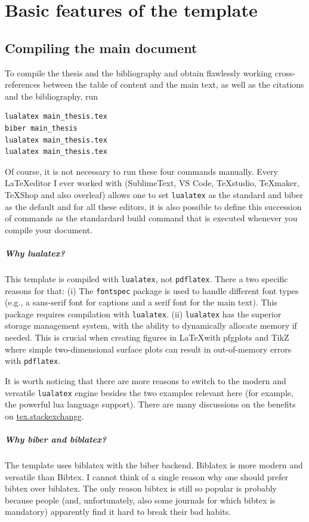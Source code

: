 \graphicspath{{chapters/1_basicfeatures/figures/}}

\chapter{Basic features of the template}
\section{Compiling the main document}
To compile the thesis and the bibliography and obtain flawlessly working cross-references between the table of content and the main text, as well as the citations and the bibliography, run
\begin{lstlisting}
lualatex main_thesis.tex
biber main_thesis
lualatex main_thesis.tex
lualatex main_thesis.tex
\end{lstlisting}
Of course, it is not necessary to run these four commands manually. Every \LaTeX editor I ever worked with (SublimeText, VS Code, TeXstudio, TeXmaker, TeXShop and also overleaf) allows one to set \verb|lualatex| as the standard and biber as the default and for all these editors, it is also possible to define this succession of commands as the standardard build command that is executed whenever you compile your document.

\paragraph{Why lualatex?} This template is compiled with \verb|lualatex|, not \verb|pdflatex|. There a two specific reasons for that: 
(i) The \verb|fontspec| package is used to handle different font types (e.g., a sans-serif font for captions and a serif font for the main text). This package requires compilation with \verb|lualatex|. 
(ii) \verb|lualatex| has the superior storage management system, with the ability to dynamically allocate memory if needed. This is crucial when creating figures in \LaTeX with pfgplots and TikZ where simple two-dimensional surface plots can result in out-of-memory errors with \verb|pdflatex|.

It is worth noticing that there are more reasons to switch to the modern and versatile \verb|lualatex| engine besides the two examples relevant here (for example, the powerful lua language support). There are many discussions on the benefits on \href{tex.stackexchange.com}{tex.stackexchange}.

\paragraph{Why biber and biblatex?} The template uses biblatex with the biber backend. Biblatex is more modern and versatile than Bibtex.
I cannot think of a single reason why one should prefer bibtex over biblatex. The only reason bibtex is still so popular is probably because people (and, unfortunately, also some journals for which bibtex is mandatory) apparently find it hard to break their bad habits.

